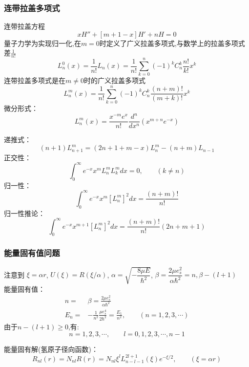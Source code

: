 \begin{frame}
	\frametitle{连带拉盖多项式}
	连带拉盖方程
	\begin{equation*}
		\boxed{x H''  + [m+1 -x] H' +n H =0}
	\end{equation*}	
	量子力学为实现归一化,在$m=0$时定义了广义拉盖多项式,与数学上的拉盖多项式差$\frac{1}{n!}$
	\begin{equation*}
		L^0 _n (x)= \frac{1} {n!} L_n (x) = \frac{1} {n!} \sum_{k=0}^{n} (-1)^k C^k _n \frac{n!}{k!}x^k
	\end{equation*}	
	连带拉盖多项式是在$m\ne0$时的广义拉盖多项式
	\begin{equation*}
		L^m _n (x)= \frac{1} {n!}  \sum_{k=0}^{n} (-1)^k C^k _n \frac{(n+m)!}{(m+k)!}x^k
	\end{equation*}	
	微分形式： 
	\begin{equation*}
		L^m _n(x) =\frac{x^{-m}e^x  }{n!} \frac{d ^n}{d x^n} (x^{m+n} e^{-x})
	\end{equation*}	
\end{frame}		

\begin{frame}
	递推式：
	\begin{equation*}
		(n+1)	L^m _{n+1} = (2n+1+m -x) L^m _n  - (n+m)  L_{n-1}  
	\end{equation*}	
	正交性：
	\begin{equation*}
		\int_{0}^{\infty}  e^{-x} x^m  L^m _n L^ m _k dx =0, \qquad  (k\ne n)
	\end{equation*}	
	归一性：
	\begin{equation*}
		\int_{0}^{\infty}  e^{-x} x^m  [L^m _{n}]^2  dx = \frac{(n+m)!}{n!} 
	\end{equation*}			
	归一性推论：
	\begin{equation*}
		\int_{0}^{\infty}  e^{-x} x^{m+1}  [L^m _{n}]^2  dx = \frac{(n+m)!}{n!}  (2n+m+1)
	\end{equation*}			
\end{frame}		

\begin{frame}
	\frametitle{能量固有值问题}	
	注意到 $\xi=\alpha r$, $U(\xi)=R(\xi /\alpha) $, $\alpha =\sqrt{-\dfrac{8\mu E}{\hbar^2}}$, $\beta=\dfrac{2\mu e^2 _s}{\alpha \hbar^2}=n, \beta-(l+1)$\\
	能量固有值：
	\\\begin{equation*}
		\begin{split}
			n =&\beta = \frac{2\mu e^2 _s}{\alpha \hbar ^2} \\
			E_n =& - \frac{1}{n^2} \frac{\mu e^4 _s }{2 \hbar ^2} =\frac{E_1}{n^2}, \qquad (n=1,2,3,\cdots) 
		\end{split}		
	\end{equation*}	
	由于${n-(l+1)\ge 0}$,有:
	\[n=1,2,3,\cdots, \qquad l=0,1,2,3,\cdots, n-1\]	

	能量固有解(氢原子径向函数)：
	\begin{equation*}
		R_{nl} (r) =N_{nl}R(r)=N_{nl} \xi  ^l  L_{n-l-1} ^{2l+1} (\xi) e^{-\xi/2} , \qquad (\xi =\alpha r)
	\end{equation*}	
\end{frame}			

